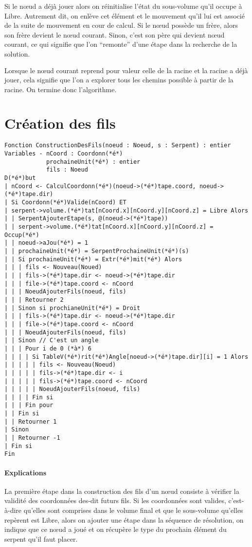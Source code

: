 Si le nœud a déjà jouer alors on réinitialise l'état du sous-volume qu'il occupe à Libre. Autrement dit, on enlève cet élément et le mouvement qu'il lui est associé de la suite de mouvement en cour de calcul. Si le nœud possède un frère, alors son frère devient le nœud courant. Sinon, c'est son père qui devient nœud courant, ce qui signifie que l'on ``remonte'' d'une étape dans la recherche de la solution.

Lorsque le nœud courant reprend pour valeur celle de la racine et la racine a déjà jouer, cela signifie que l'on a explorer tous les chemins possible à partir de la racine. On termine donc l'algorithme.

\newpage
\section{Création des fils}

\begin{lstlisting}[caption=Algorithme de création des fils]
Fonction ConstructionDesFils(noeud : Noeud, s : Serpent) : entier
Variables - nCoord : Coordonn(*é*)
            prochaineUnit(*é*) : entier
            fils : Noeud
D(*é*)but
| nCoord <- CalculCoordonn(*é*)(noeud->(*é*)tape.coord, noeud->(*é*)tape.dir)
| Si Coordonn(*é*)Valide(nCoord) ET
| serpent->volume.(*é*)tat[nCoord.x][nCoord.y][nCoord.z] = Libre Alors
| | SerpentAjouterEtape(s, @(noeud->(*é*)tape))
| | serpent->volume.(*é*)tat[nCoord.x][nCoord.y][nCoord.z] = Occup(*é*)
| | noeud->aJou(*é*) = 1
| | prochaineUnit(*é*) = SerpentProchaineUnit(*é*)(s)
| | Si prochaineUnit(*é*) = Extr(*é*)mit(*é*) Alors
| | | fils <- Nouveau(Noued)
| | | fils->(*é*)tape.dir <- noeud->(*é*)tape.dir
| | | file->(*é*)tape.coord <- nCoord
| | | NoeudAjouterFils(noeud, fils)
| | | Retourner 2
| | Sinon si prochianeUnit(*é*) = Droit
| | | fils->(*é*)tape.dir <- noeud->(*é*)tape.dir
| | | file->(*é*)tape.coord <- nCoord
| | | NoeudAjouterFils(noeud, fils)
| | Sinon // C'est un angle
| | | Pour i de 0 (*à*) 6
| | | | Si TableV(*é*)rit(*é*)Angle[noeud->(*é*)tape.dir][i] = 1 Alors
| | | | | fils <- Nouveau(Noeud)
| | | | | fils->(*é*)tape.dir <- i
| | | | | fils->(*é*)tape.coord <- nCoord
| | | | | NoeudAjouterFils(noeud, fils)
| | | | Fin si
| | | Fin pour
| | Fin si
| | Retourner 1
| Sinon
| | Retourner -1
| Fin si
Fin
\end{lstlisting}

\paragraph{Explications} La première étape dans la construction des fils d'un nœud consiste à vérifier la validité des coordonnées des-dit futurs fils. Si les coordonnées sont valides, c'est-à-dire qu'elles sont comprises dans le volume final et que le sous-volume qu'elles repèrent est Libre, alors on ajouter une étape dans la séquence de résolution, on indique que ce nœud a joué et on récupère le type du prochain élément du serpent qu'il faut placer.

